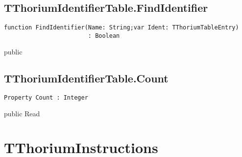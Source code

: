 \subsection{TThoriumIdentifierTable.FindIdentifier}
\label{thoriumcore:thorium:tthoriumidentifiertable:findidentifier}
\begin{FPCList}
\Synopsis
\Declaration 

\begin{verbatim}
function FindIdentifier(Name: String;var Ident: TThoriumTableEntry)
                        : Boolean
\end{verbatim}
\Visibility
public
\Description
\Errors
\end{FPCList}
\subsection{TThoriumIdentifierTable.Count}
\label{thoriumcore:thorium:tthoriumidentifiertable:count}
\begin{FPCList}
\Synopsis
\Declaration 

\begin{verbatim}
Property Count : Integer
\end{verbatim}
\Visibility
public
\Access
Read
\Description
\end{FPCList}
\section{TThoriumInstructions}
\label{thoriumcore:thorium:tthoriuminstructions}
